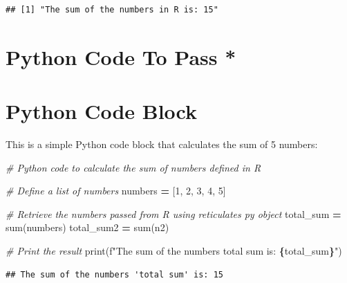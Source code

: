 \documentclass[
  12 pt,
  a4paper,
]{book}
\newenvironment{Shaded}{\begin{snugshade}}{\end{snugshade}}
\newcommand{\BuiltInTok}[1]{#1}
\newcommand{\CommentTok}[1]{\textcolor[rgb]{0.56,0.35,0.01}{\textit{#1}}}
\newcommand{\DecValTok}[1]{\textcolor[rgb]{0.00,0.00,0.81}{#1}}
\newcommand{\NormalTok}[1]{#1}
\newcommand{\OperatorTok}[1]{\textcolor[rgb]{0.81,0.36,0.00}{\textbf{#1}}}
\newcommand{\OtherTok}[1]{\textcolor[rgb]{0.56,0.35,0.01}{#1}}
\newcommand{\SpecialCharTok}[1]{\textcolor[rgb]{0.81,0.36,0.00}{\textbf{#1}}}
\newcommand{\SpecialStringTok}[1]{\textcolor[rgb]{0.31,0.60,0.02}{#1}}
\numberwithin{equation}{section}
\theoremstyle{plain}      %
\theoremstyle{definition} %
\theoremstyle{remark}     %
\theoremstyle{note}         %
\begin{document}
\begin{verbatim}
## [1] "The sum of the numbers in R is: 15"
\end{verbatim}

\hypertarget{python-code-to-pass}{%
\section{Python Code To Pass *}\label{python-code-to-pass}}

\begin{Shaded}
\end{Shaded}

\hypertarget{python-code-block}{%
\section{Python Code Block}\label{python-code-block}}

This is a simple Python code block that calculates the sum of 5 numbers:

\begin{Shaded}
\begin{Highlighting}[]
\CommentTok{\# Python code to calculate the sum of numbers defined in R}

\CommentTok{\# Define a list of numbers}
\NormalTok{numbers }\OperatorTok{=}\NormalTok{ [}\DecValTok{1}\NormalTok{, }\DecValTok{2}\NormalTok{, }\DecValTok{3}\NormalTok{, }\DecValTok{4}\NormalTok{, }\DecValTok{5}\NormalTok{]}

\CommentTok{\# Retrieve the numbers passed from R using reticulate\textquotesingle{}s \textquotesingle{}py\textquotesingle{} object}
\NormalTok{total\_sum }\OperatorTok{=} \BuiltInTok{sum}\NormalTok{(numbers)}
\NormalTok{total\_sum2 }\OperatorTok{=} \BuiltInTok{sum}\NormalTok{(n2)}

\CommentTok{\# Print the result}
\BuiltInTok{print}\NormalTok{(}\SpecialStringTok{f"The sum of the numbers \textquotesingle{}total sum\textquotesingle{} is: }\SpecialCharTok{\{}\NormalTok{total\_sum}\SpecialCharTok{\}}\SpecialStringTok{"}\NormalTok{)}
\end{Highlighting}
\end{Shaded}

\begin{verbatim}
## The sum of the numbers 'total sum' is: 15
\end{verbatim}
\end{document}
